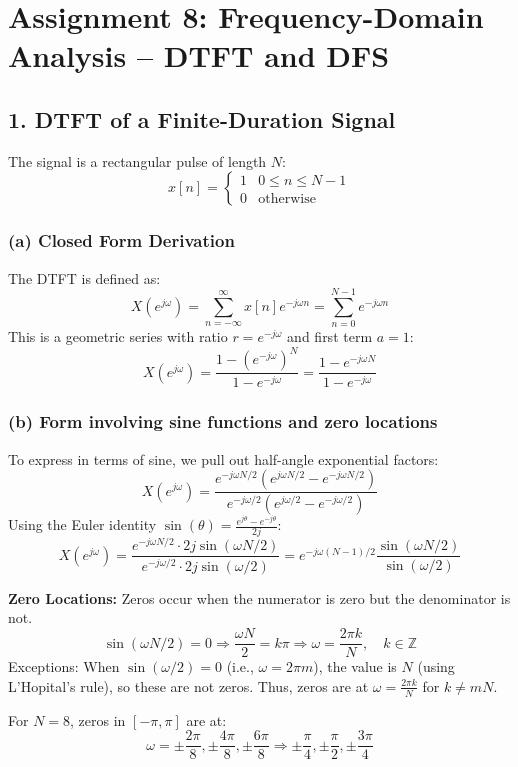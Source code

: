 \documentclass[11pt, a4paper]{article}
\begin{document}
\newpage
\section{Assignment 8: Frequency-Domain Analysis – DTFT and DFS}

\subsection{1. DTFT of a Finite-Duration Signal}
The signal is a rectangular pulse of length $N$:
$$ x[n] = \begin{cases} 1 & 0 \le n \le N-1 \\ 0 & \text{otherwise} \end{cases} $$

\subsubsection{(a) Closed Form Derivation}
The DTFT is defined as:
$$ X(e^{j\omega}) = \sum_{n=-\infty}^{\infty} x[n]e^{-j\omega n} = \sum_{n=0}^{N-1} e^{-j\omega n} $$
This is a geometric series with ratio $r = e^{-j\omega}$ and first term $a=1$:
$$ X(e^{j\omega}) = \frac{1 - (e^{-j\omega})^N}{1 - e^{-j\omega}} = \frac{1 - e^{-j\omega N}}{1 - e^{-j\omega}} $$

\subsubsection{(b) Form involving sine functions and zero locations}
To express in terms of sine, we pull out half-angle exponential factors:
$$ X(e^{j\omega}) = \frac{e^{-j\omega N/2} (e^{j\omega N/2} - e^{-j\omega N/2})}{e^{-j\omega/2} (e^{j\omega/2} - e^{-j\omega/2})} $$
Using the Euler identity $\sin(\theta) = \frac{e^{j\theta} - e^{-j\theta}}{2j}$:
$$ X(e^{j\omega}) = \frac{e^{-j\omega N/2} \cdot 2j \sin(\omega N/2)}{e^{-j\omega/2} \cdot 2j \sin(\omega/2)} = e^{-j\omega(N-1)/2} \frac{\sin(\omega N/2)}{\sin(\omega/2)} $$

\textbf{Zero Locations:}
Zeros occur when the numerator is zero but the denominator is not.
$$ \sin(\omega N/2) = 0 \Rightarrow \frac{\omega N}{2} = k\pi \Rightarrow \omega = \frac{2\pi k}{N}, \quad k \in \mathbb{Z} $$
Exceptions: When $\sin(\omega/2) = 0$ (i.e., $\omega = 2\pi m$), the value is $N$ (using L'Hopital's rule), so these are not zeros.
Thus, zeros are at $\omega = \frac{2\pi k}{N}$ for $k \ne mN$.

For $N=8$, zeros in $[-\pi, \pi]$ are at:
$$ \omega = \pm \frac{2\pi}{8}, \pm \frac{4\pi}{8}, \pm \frac{6\pi}{8} \Rightarrow \pm \frac{\pi}{4}, \pm \frac{\pi}{2}, \pm \frac{3\pi}{4} $$
\end{document}
